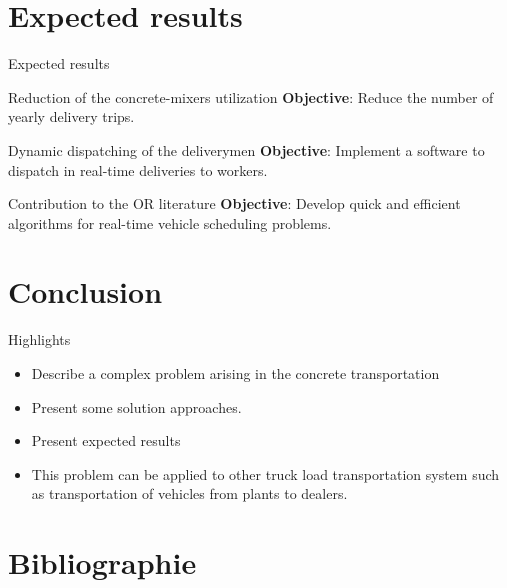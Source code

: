 \documentclass[9pt,xcolor={dvipsnames}]{beamer}
\begin{document}
\section{Expected results}
\begin{frame}{Expected results}

\begin{block}{Reduction of the concrete-mixers utilization}
\textbf{Objective}: Reduce the number of yearly delivery trips. %
\end{block}

\begin{block}{Dynamic dispatching of the deliverymen}
\textbf{Objective}:  Implement a software to dispatch in real-time deliveries to workers.
\end{block}


\begin{block}{Contribution to the OR literature}
\textbf{Objective}: Develop quick and efficient algorithms for real-time vehicle scheduling problems.
\end{block}
\end{frame}


\section{Conclusion}
\begin{frame}{Highlights}

\begin{itemize}
\item Describe a complex problem arising in the concrete transportation
\vspace{0.2cm}
\item Present some solution approaches.
\vspace{0.2cm}
\item Present expected results
\vspace{0.2cm}
\item This problem can be applied to other truck load transportation system such as transportation of vehicles from plants to dealers. 
\end{itemize}

\end{frame}

\section*{Bibliographie}
\vspace{0.2cm}
%


\end{document}
